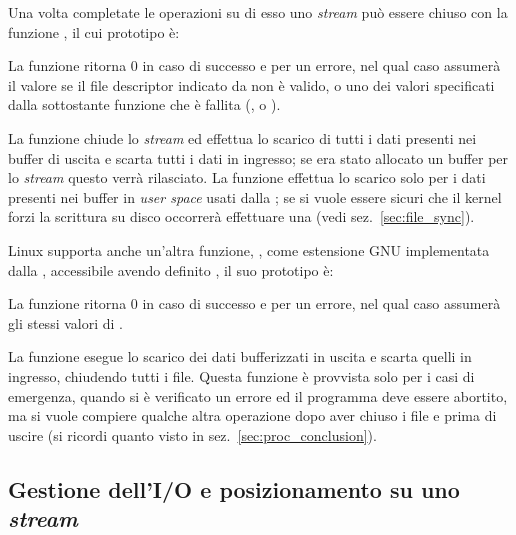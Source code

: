 Una volta completate le operazioni su di esso uno \textit{stream} può essere
chiuso con la funzione , il cui prototipo è:

\begin{funcproto}{
}

{La funzione ritorna $0$ in caso di successo e  per un errore, nel
  qual caso  assumerà il valore  se il file
  descriptor indicato da  non è valido, o uno dei valori
  specificati dalla sottostante funzione che è fallita (,
   o ).
}
\end{funcproto}

La funzione chiude lo \textit{stream}  ed effettua lo scarico di
tutti i dati presenti nei buffer di uscita e scarta tutti i dati in ingresso;
se era stato allocato un buffer per lo \textit{stream} questo verrà
rilasciato. La funzione effettua lo scarico solo per i dati presenti nei
buffer in \textit{user space} usati dalla ; se si vuole essere
sicuri che il kernel forzi la scrittura su disco occorrerà effettuare una
 (vedi sez.~\ref{sec:file_sync}).

Linux supporta anche un'altra funzione, , come estensione
GNU implementata dalla , accessibile avendo definito
, il suo prototipo è:

\begin{funcproto}{
}

{La funzione ritorna $0$ in caso di successo e  per un errore, nel
  qual caso  assumerà gli stessi valori di .}  
\end{funcproto}

La funzione esegue lo scarico dei dati bufferizzati in uscita e scarta quelli
in ingresso, chiudendo tutti i file. Questa funzione è provvista solo per i
casi di emergenza, quando si è verificato un errore ed il programma deve
essere abortito, ma si vuole compiere qualche altra operazione dopo aver
chiuso i file e prima di uscire (si ricordi quanto visto in
sez.~\ref{sec:proc_conclusion}).


\subsection{Gestione dell'I/O e posizionamento su uno \textit{stream}}
\label{sec:file_io}


